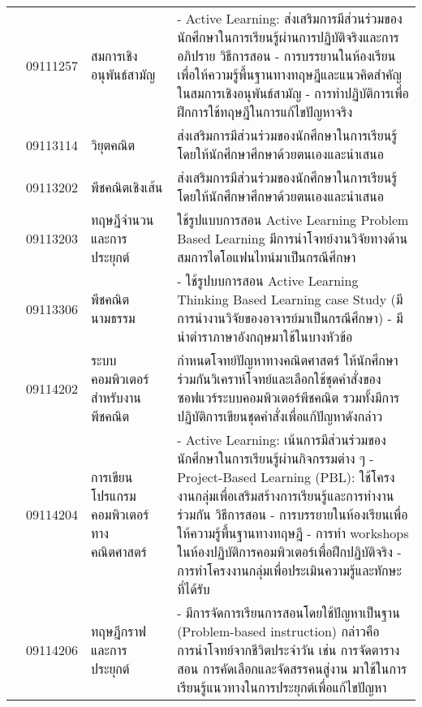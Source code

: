 {\begin{center}
\begin{longtable}{|p{}|p{}|p{}|p{}|}
	\\ 
	\cline{2-4}
	& 09111257 & สมการเชิงอนุพันธ์สามัญ&- Active Learning: ส่งเสริมการมีส่วนร่วมของนักศึกษาในการเรียนรู้ผ่านการปฏิบัติจริงและการอภิปราย
	วิธีการสอน
	\newline- การบรรยานในห้องเรียนเพื่อให้ความรู้พื้นฐานทางทฤษฎีและแนวคิดสำคัญในสมการเชิงอนุพันธ์สามัญ
	\newline- การทำปฏิบัติการเพื่อฝึกการใช้ทฤษฎีในการแก้ไขปัญหาจริง
	\\ 
	\cline{2-4}
	& 09113114 & วิยุตคณิต&
	ส่งเสริมการมีส่วนร่วมของนักศึกษาในการเรียนรู้โดยให้นักศึกษาศึกษาด้วยตนเองและนำเสนอ\\
	\cline{2-4}
	& 09113202 & พีชคณิตเชิงเส้น&
	ส่งเสริมการมีส่วนร่วมของนักศึกษาในการเรียนรู้โดยให้นักศึกษาศึกษาด้วยตนเองและนำเสนอ\\ 
	\cline{2-4}
	& 09113203 & ทฤษฎีจำนวนและการประยุกต์&
	ใช้รูปแบบการสอน Active Learning  Problem Based Learning  มีการนำโจทย์งานวิจัยทางด้านสมการไดโอแฟนไทน์มาเป็นกรณีศึกษา  	       
	\\ 
	\cline{2-4}
	& 09113306 & พีชคณิตนามธรรม&
	- ใช้รูปบบการสอน Active Learning Thinking Based Learning case Study (มีการนำงานวิจัยของอาจารย์มาเป็นกรณีศึกษา)
	\newline- มีนำตำราภาษาอังกฤษมาใช้ในบางหัวข้อ		        	       
	\\ 
	\cline{2-4}
	& 09114202 & ระบบคอมพิวเตอร์สำหรับงานพีชคณิต&
	กำหนดโจทย์ปัญหาทางคณิตศาสตร์ ให้นักศึกษาร่วมกันวิเคราห์โจทย์และเลือกใช้ชุดคำสั่งของซอฟแวร์ระบบคอมพิวเตอร์พีชคณิต รวมทั้งมีการปฏิบัติการเขียนชุดคำสั่งเพื่อแก้ปัญหาดังกล่าว	
	\\ \hline       	       
	& 09114204 & การเขียนโปรแกรมคอมพิวเตอร์ทางคณิตศาสตร์&
	- Active Learning: เน้นการมีส่วนร่วมของนักศึกษาในการเรียนรู้ผ่านกิจกรรมต่าง ๆ
	\newline- Project-Based Learning (PBL): ใช้โครงงานกลุ่มเพื่อเสริมสร้างการเรียนรู้และการทำงานร่วมกัน
	\newline วิธีการสอน
	\newline- การบรรยายในห้องเรียนเพื่อให้ความรู้พื้นฐานทางทฤษฎี
	\newline- การทำ workshops ในห้องปฏิบัติการคอมพิวเตอร์เพื่อฝึกปฏิบัติจริง
	\newline- การทำโครงงานกลุ่มเพื่อประเมินความรู้และทักษะที่ได้รับ		      	        	       
	\\ 
	\cline{2-4}
	& 09114206 & ทฤษฎีกราฟและการประยุกต์&
	- มีการจัดการเรียนการสอนโดยใช้ปัญหาเป็นฐาน (Problem-based instruction) กล่าวคือ การนำโจทย์จากชีวิตประจำวัน เช่น การจัดตารางสอน การคัดเลือกและจัดสรรคนสู่งาน มาใช้ในการเรียนรู้แนวทางในการประยุกต์เพื่อแก้ไขปัญหา

\end{longtable}
\end{center}}
